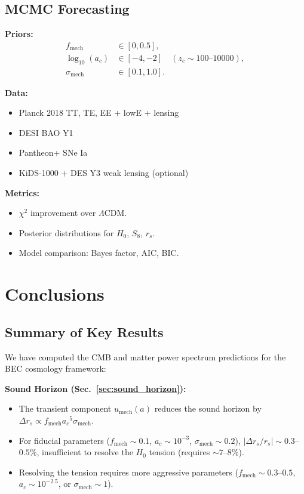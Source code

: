 \documentclass[11pt,a4paper]{article}
\newcommand{\umech}{\ensuremath{u_{\mathrm{mech}}}}
\newcommand{\fmech}{\ensuremath{f_{\mathrm{mech}}}}
\newcommand{\ac}{\ensuremath{a_c}}
\newcommand{\sigmamech}{\ensuremath{\sigma_{\mathrm{mech}}}}
\newcommand{\rs}{\ensuremath{r_s}}
\theoremstyle{definition}
\theoremstyle{remark}
\begin{document}
\subsection{MCMC Forecasting}
\label{sec:mcmc_forecasting}

\textbf{Priors:}
\begin{align}
\fmech &\in [0, 0.5], \\
\log_{10}(\ac) &\in [-4, -2] \quad (z_c \sim 100\text{--}10000), \\
\sigmamech &\in [0.1, 1.0].
\end{align}

\textbf{Data:}
\begin{itemize}[leftmargin=*, itemsep=0.2em]
\item Planck 2018 TT, TE, EE + lowE + lensing
\item DESI BAO Y1
\item Pantheon+ SNe Ia
\item KiDS-1000 + DES Y3 weak lensing (optional)
\end{itemize}

\textbf{Metrics:}
\begin{itemize}[leftmargin=*, itemsep=0.2em]
\item $\chi^2$ improvement over $\Lambda$CDM.
\item Posterior distributions for $H_0$, $S_8$, $\rs$.
\item Model comparison: Bayes factor, AIC, BIC.
\end{itemize}

\section{Conclusions}
\label{sec:conclusions}

\subsection{Summary of Key Results}
\label{sec:summary}

We have computed the CMB and matter power spectrum predictions for the BEC cosmology framework:

\textbf{Sound Horizon (Sec.~\ref{sec:sound_horizon}):}
\begin{itemize}[leftmargin=*, itemsep=0.2em]
\item The transient component $\umech(a)$ reduces the sound horizon by $\Delta\rs \propto \fmech \ac^5 \sigmamech$.
\item For fiducial parameters ($\fmech \sim 0.1$, $\ac \sim 10^{-3}$, $\sigmamech \sim 0.2$), $|\Delta\rs/\rs| \sim 0.3$--$0.5\%$, insufficient to resolve the $H_0$ tension (requires $\sim 7$--$8\%$).
\item Resolving the tension requires more aggressive parameters ($\fmech \sim 0.3$--$0.5$, $\ac \sim 10^{-2.5}$, or $\sigmamech \sim 1$).
\end{itemize}
\end{document}
